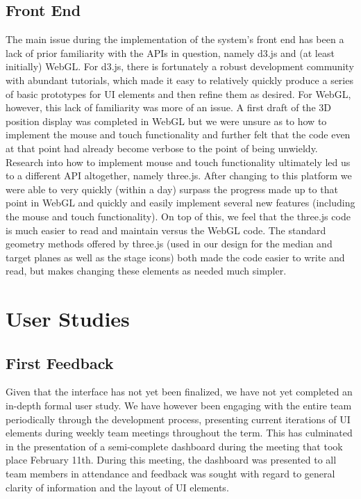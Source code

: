 \documentclass[journal,10pt,onecolumn,compsoc]{IEEEtran}
\begin{document}
	\subsection{Front End}
		The main issue during the implementation of the system's front end has been a lack of prior familiarity with the APIs in question, namely d3.js and (at least initially) WebGL.
		For d3.js, there is fortunately a robust development community with abundant tutorials, which made it easy to relatively quickly produce a series of basic prototypes for UI elements and then refine them as desired.
		For WebGL, however, this lack of familiarity was more of an issue.
		A first draft of the 3D position display was completed in WebGL but we were unsure as to how to implement the mouse and touch functionality and further felt that the code even at that point had already become verbose to the point of being unwieldy.
		Research into how to implement mouse and touch functionality ultimately led us to a different API altogether, namely three.js.
		After changing to this platform we were able to very quickly (within a day) surpass the progress made up to that point in WebGL and quickly and easily implement several new features (including the mouse and touch functionality).
		On top of this, we feel that the three.js code is much easier to read and maintain versus the WebGL code.
		The standard geometry methods offered by three.js (used in our design for the median and target planes as well as the stage icons) both made the code easier to write and read, but makes changing these elements as needed much simpler.		
\newpage


\section{User Studies}

	\subsection{First Feedback}
		Given that the interface has not yet been finalized, we have not yet completed an in-depth formal user study.
		We have however been engaging with the entire team periodically through the development process, presenting current iterations of UI elements during weekly team meetings throughout the term.
		This has culminated in the presentation of a semi-complete dashboard during the meeting that took place February 11th.
		During this meeting, the dashboard was presented to all team members in attendance and feedback was sought with regard to general clarity of information and the layout of UI elements.
	
\end{document}
